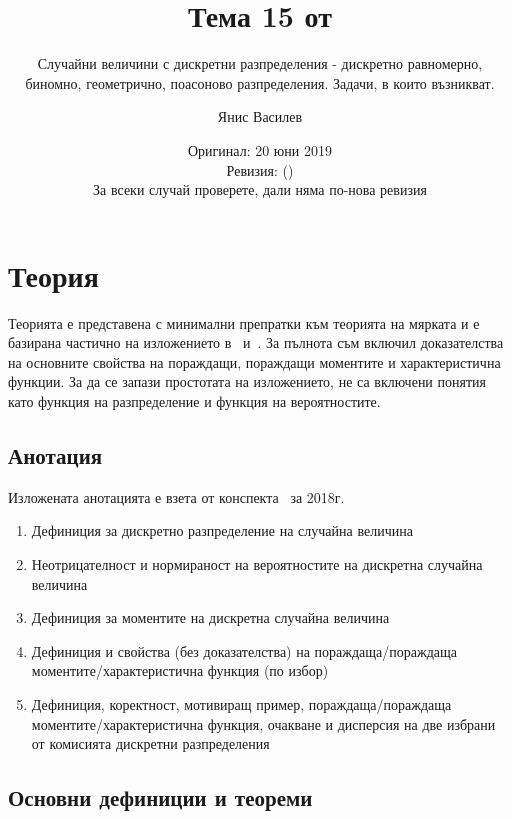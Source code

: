 \documentclass[numbers=endperiod, bibliography=totocnumbered]{scrartcl}
\title{Тема 15 от \URL{https://github.com/v--/se2018}}
\subtitle{Случайни величини с дискретни разпределения - дискретно равномерно, биномно, геометрично, поасоново разпределения. Задачи, в които възникват.}
\author{Янис Василев}
\date{Оригинал: 20 юни 2019 \\ Ревизия: \gitAbbrevHash{} (\gitAuthorDate) \\ За всеки случай проверете, дали няма по-нова ревизия}
\begin{document}
\maketitle

\section{Теория}

Теорията е представена с минимални препратки към теорията на мярката и е базирана частично на изложението в~\cite{Borovkov} и~\cite{DimitrovYanev}. За пълнота съм включил доказателства на основните свойства на пораждащи, пораждащи моментите и характеристична функции. За да се запази простотата на изложението, не са включени понятия като функция на разпределение и функция на вероятностите.

\subsection{Анотация}

Изложената анотацията е взета от конспекта~\cite{Syllabus} за 2018г.

\begin{enumerate}
  \item Дефиниция за дискретно разпределение на случайна величина
  \item Неотрицателност и нормираност на вероятностите на дискретна случайна величина
  \item Дефиниция за моментите на дискретна случайна величина
  \item Дефиниция и свойства (без доказателства) на пораждаща/пораждаща моментите/характеристична функция (по избор)
  \item Дефиниция, коректност, мотивиращ пример, пораждаща/пораждаща моментите/характеристична функция, очакване и дисперсия на две избрани от комисията дискретни разпределения
\end{enumerate}

\subsection{Основни дефиниции и теореми}
\end{document}
